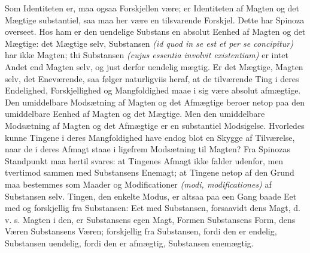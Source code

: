 \documentclass[11pt]{book}
\newcommand{\opage}[1]{\marginnote{\footnotesize\textit{[#1]}}}
\begin{document}
Som Identiteten er, maa ogsaa Forskjellen være; er Identiteten af Magten
og det Mægtige substantiel, saa maa her være en tilsvarende Forskjel.
Dette har Spinoza overseet. Hos ham er den uendelige Substans en absolut
Eenhed af Magten og det Mægtige: det Mægtige selv, Substansen
\textit{(id quod in se est et per se concipitur)} har ikke Magten; thi
Substansen \textit{(cujus essentia involvit existentiam)} er intet Andet
end Magten selv, og just derfor uendelig mægtig. Er det Mægtige, Magten
selv, det Eneværende, saa følger naturligviis heraf, at de tilværende
Ting i deres Endelighed, Forskjellighed og Mangfoldighed maae i sig være
absolut afmægtige. Den umiddelbare Modsætning af Magten og det Afmægtige
beroer netop paa den umiddelbare Eenhed af Magten og det Mægtige. Men
den umiddelbare Modsætning af Magten og det Afmægtige er en substantiel
Modsigelse. Hvorledes kunne Tingene i deres Mangfoldighed have endog blot
en Skygge af Tilværelse, naar de i deres Afmagt staae i ligefrem
Modsætning til Magten? Fra Spinozas Standpunkt maa hertil svares: at
Tingenes Afmagt ikke falder udenfor, men tvertimod sammen med
Substansens Enemagt; at Tingene netop af den Grund maa bestemmes som
Maader og Modificationer \textit{(modi, modificationes)} af Substansen
selv. Tingen, den enkelte Modus, er altsaa paa een Gang baade
\opage{112} \setcounter{footnote}{0}%
Eet med og forskjellig fra Substansen: Eet med Substansen, forsaavidt
dens Magt, d. v. s. Magten i den, er Substansens egen Magt, Formen
Substansens Form, dens Væren Substansens Væren; forskjellig fra
Substansen, fordi den er endelig, Substansen uendelig, fordi den er
afmægtig, Substansen enemægtig.
\end{document}
